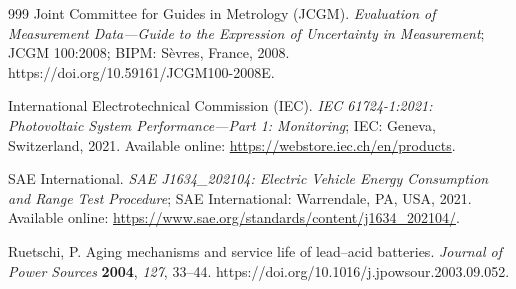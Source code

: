 \documentclass[vehicles,article,submit,moreauthors]{Definitions/mdpi}
\begin{document}
\begin{thebibliography}{999}
    Joint Committee for Guides in Metrology (JCGM). \textit{Evaluation of Measurement Data---Guide to the Expression of Uncertainty in Measurement}; JCGM 100:2008; BIPM: Sèvres, France, 2008. https://doi.org/10.59161/JCGM100-2008E.

    International Electrotechnical Commission (IEC). \textit{IEC 61724-1:2021: Photovoltaic System Performance---Part 1: Monitoring}; IEC: Geneva, Switzerland, 2021. Available online: \url{https://webstore.iec.ch/en/products}.

    SAE International. \textit{SAE J1634\_202104: Electric Vehicle Energy Consumption and Range Test Procedure}; SAE International: Warrendale, PA, USA, 2021. Available online: \url{https://www.sae.org/standards/content/j1634_202104/}.

    Ruetschi, P. Aging mechanisms and service life of lead--acid batteries. \textit{Journal of Power Sources} \textbf{2004}, \textit{127}, 33--44. https://doi.org/10.1016/j.jpowsour.2003.09.052.
\end{thebibliography}
\end{document}
